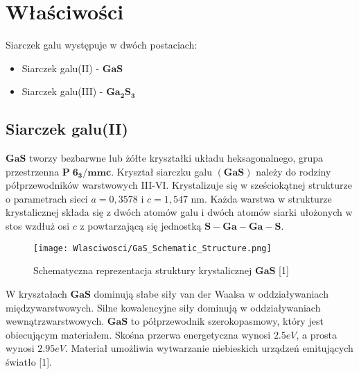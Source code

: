 \newpage

\section{Właściwości}
Siarczek galu występuje w dwóch postaciach:
\begin{itemize}
	\item Siarczek galu(II) - $\mathbf{GaS}$
	\item Siarczek galu(III) - $\mathbf{Ga_{2}S_{3}}$
\end{itemize}

\subsection{Siarczek galu(II)}
$\mathbf{GaS}$ tworzy bezbarwne lub żółte kryształki układu heksagonalnego, grupa przestrzenna
$\mathbf{P\;6_{3}/mmc}$. Kryształ siarczku galu $\mathbf{(GaS)}$ należy do rodziny półprzewodników warstwowych III-VI. Krystalizuje się w sześciokątnej strukturze o parametrach sieci $a = 0,3578$ i $c = 1,547$ nm. Każda warstwa w strukturze krystalicznej składa się z dwóch atomów galu i dwóch atomów siarki ułożonych w stos wzdłuż osi $c$ z powtarzającą się jednostką $\mathbf{S-Ga-Ga-S}$.
\begin{figure}[H]
	\begin{center}
		\texttt{[image: Wlasciwosci/GaS\_Schematic\_Structure.png]}
		\caption{Schematyczna reprezentacja struktury krystalicznej $\mathbf{GaS}$ [1]}
	\end{center}
\end{figure}
W kryształach $\mathbf{GaS}$ dominują słabe siły van der Waalsa w oddziaływaniach międzywarstwowych. Silne kowalencyjne siły dominują w oddziaływaniach wewnątrzwarstwowych.
$\mathbf{GaS}$ to półprzewodnik szerokopasmowy, który jest obiecującym materiałem. Skośna przerwa energetyczna wynosi $2.5eV$, a prosta wynosi $2.95eV$. Materiał umożliwia
wytwarzanie niebieskich urządzeń emitujących światło [1].

\newpage

